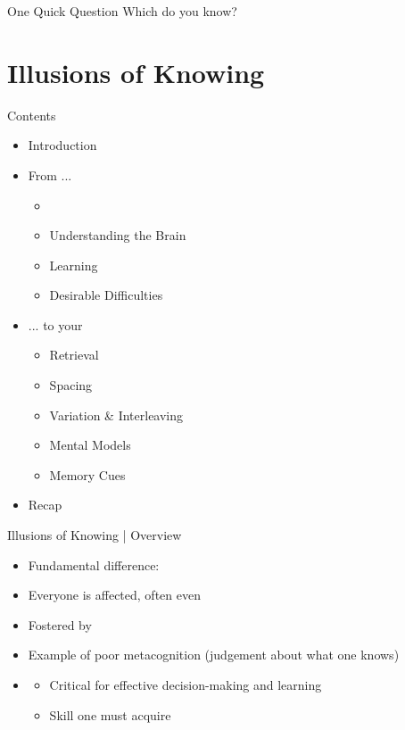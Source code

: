 \documentclass{ercisbeamer}
\begin{document}
\begin{frame}{One Quick Question}
    \centering Which  do you know?
\end{frame}

\section{Illusions of Knowing}
\begin{frame}{Contents}
    \begin{itemize}
        \item Introduction
        \item From ...
        \begin{itemize}
            \item {}
            \item Understanding the Brain
            \item Learning
            \item Desirable Difficulties
        \end{itemize}
        \item ... to your 
        \begin{itemize}
            \item Retrieval
            \item Spacing
            \item Variation \& Interleaving
            \item Mental Models
            \item Memory Cues
        \end{itemize}
        \item Recap
    \end{itemize}
\end{frame}

\begin{frame}{Illusions of Knowing | Overview}
    \begin{tbox}
        \begin{itemize}
            \item Fundamental difference: 
            \item Everyone is affected, often  even 
            \item Fostered by 
            \item Example of poor metacognition (judgement about what one knows)
            \item {}
            \begin{itemize}
                \item Critical for effective decision-making and learning
                \item Skill one must acquire
            \end{itemize}
        \end{itemize}
    \end{tbox}
\end{frame}
\end{document}
